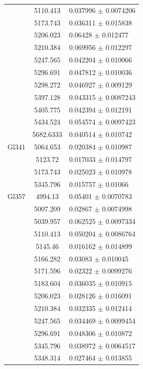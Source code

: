 \begin{longtable}{|c|c|l|}
 & 5110.413 & 0.037996 $\pm$ 0.0074206 \\       
 & 5173.743 & 0.036311 $\pm$ 0.015838 \\        
 & 5206.023 & 0.06428 $\pm$ 0.012477 \\         
 & 5210.384 & 0.069956 $\pm$ 0.012297 \\        
 & 5247.565 & 0.042204 $\pm$ 0.010066 \\        
 & 5296.691 & 0.047812 $\pm$ 0.010036 \\        
 & 5298.272 & 0.046927 $\pm$ 0.009129 \\        
 & 5397.128 & 0.043315 $\pm$ 0.0087243 \\       
 & 5405.775 & 0.042394 $\pm$ 0.012191 \\        
 & 5434.524 & 0.054574 $\pm$ 0.0097423 \\       
 & 5682.6333 & 0.040514 $\pm$ 0.010742 \\       
\hline                                          
Gl341 & 5064.653 & 0.020384 $\pm$ 0.010987 \\   
 & 5123.72 & 0.017033 $\pm$ 0.014797 \\         
 & 5173.743 & 0.025023 $\pm$ 0.010978 \\        
 & 5345.796 & 0.015757 $\pm$ 0.01066 \\         
\hline                                          
Gl357 & 4994.13 & 0.05401 $\pm$ 0.0070783 \\    
 & 5007.209 & 0.02867 $\pm$ 0.0074998 \\        
 & 5039.957 & 0.062525 $\pm$ 0.0097334 \\       
 & 5110.413 & 0.050204 $\pm$ 0.0086764 \\       
 & 5145.46 & 0.016162 $\pm$ 0.014899 \\         
 & 5166.282 & 0.03083 $\pm$ 0.010045 \\         
 & 5171.596 & 0.02322 $\pm$ 0.0099276 \\        
 & 5183.604 & 0.036035 $\pm$ 0.010915 \\        
 & 5206.023 & 0.028126 $\pm$ 0.016091 \\        
 & 5210.384 & 0.032335 $\pm$ 0.012414 \\        
 & 5247.565 & 0.034469 $\pm$ 0.0099454 \\       
 & 5296.691 & 0.048306 $\pm$ 0.010872 \\        
 & 5345.796 & 0.038972 $\pm$ 0.0064517 \\       
 & 5348.314 & 0.027464 $\pm$ 0.013855 \\        

\end{longtable}
